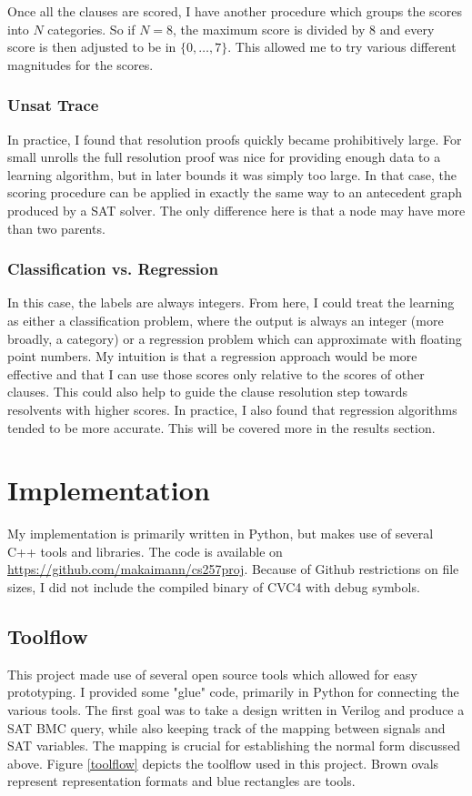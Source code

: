 \documentclass[letterpaper]{article} %
\begin{document}
Once all the clauses are scored, I have another procedure which groups the scores into $N$ categories. So if $N=8$, the maximum score is divided by $8$ and every score is then adjusted to be in $\{0, \dots, 7\}$. This allowed me to try various different magnitudes for the scores.

\subsubsection{Unsat Trace}
In practice, I found that resolution proofs quickly became prohibitively large. For small unrolls the full resolution proof was nice for providing enough data to a learning algorithm, but in later bounds it was simply too large. In that case, the scoring procedure can be applied in exactly the same way to an antecedent graph produced by a SAT solver. The only difference here is that a node may have more than two parents.
\subsubsection{Classification vs. Regression}
In this case, the labels are always integers. From here, I could treat the learning as either a classification problem, where the output is always an integer (more broadly, a category) or a regression problem which can approximate with floating point numbers. My intuition is that a regression approach would be more effective and that I can use those scores only relative to the scores of other clauses. This could also help to guide the clause resolution step towards resolvents with higher scores. In practice, I also found that regression algorithms tended to be more accurate. This will be covered more in the results section.
\section{Implementation}
My implementation is primarily written in Python, but makes use of several C++ tools and libraries. The code is available on \url{https://github.com/makaimann/cs257proj}. Because of Github restrictions on file sizes, I did not include the compiled binary of CVC4 with debug symbols.
\subsection{Toolflow}
This project made use of several open source tools which allowed for easy prototyping. I provided some "glue" code, primarily in Python for connecting the various tools. The first goal was to take a design written in Verilog and produce a SAT BMC query, while also keeping track of the mapping between signals and SAT variables. The mapping is crucial for establishing the normal form discussed above. Figure \ref{toolflow} depicts the toolflow used in this project. Brown ovals represent representation formats and blue rectangles are tools.
\end{document}
